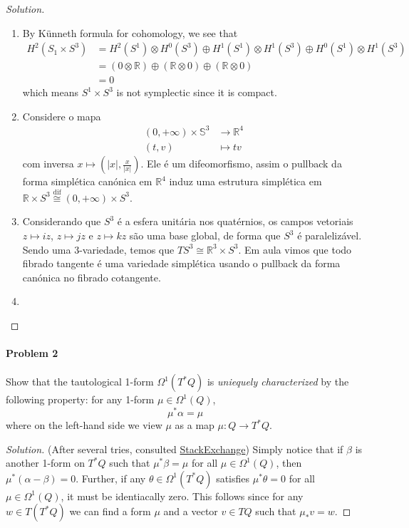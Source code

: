 \begin{proof}[Solution]\leavevmode
	\begin{enumerate}[label=\alph*.]
		\item By K\"unneth formula for cohomology, we see that
			\begin{align*}
				H^{2}(S_1\times S^3)&=H^{2}(S^1)\otimes H^{0}(S^3)\oplus H^{1}(S^1)\otimes H^{1}(S^3)\oplus H^{0}(S^1)\otimes H^{1}(S^3)\\
				&=(0\otimes  \mathbb{R})\oplus (\mathbb{R}\otimes 0)\oplus (\mathbb{R}\otimes 0)\\
				&=0
			\end{align*}
		which means $S^1\times S^3$ is not symplectic since it is compact.

		\item Considere o mapa
			\begin{align*}
				(0,+\infty)\times \mathbb{S}^3 &\longrightarrow \mathbb{R}^4 \\
				(t,v) &\longmapsto tv
			\end{align*}
			com inversa $x\mapsto \left( |x|,\frac{x}{|x|} \right)$. Ele \'e um difeomorfismo, assim o pullback da forma simpl\'etica can\'onica em $\mathbb{R}^{4}$ induz uma estrutura simpl\'etica em $\mathbb{R}\times S^3\overset{\operatorname{dif}}{\cong} (0,+\infty)\times S^3$.

		\item Considerando que $S^3$ \'e a esfera unit\'aria nos quat\'ernios, os campos vetoriais $z\mapsto iz$, $z\mapsto jz$ e $z\mapsto kz$ s\~ao uma base global, de forma que $S^3$ \'e paraleliz\'avel. Sendo uma 3-variedade, temos que $TS^3\cong \mathbb{R}^{3}\times S^3$. Em aula vimos que todo fibrado tangente \'e uma variedade simpl\'etica usando o pullback da forma can\'onica no fibrado cotangente.

		\item 
	\end{enumerate}
\end{proof}

\paragraph{Problem 2} Show that the tautological 1-form $\Omega^{1}(T^*Q)$ is \textit{uniequely characterized} by the following property: for any 1-form $\mu\in\Omega^{1}(Q)$,
\[\mu^*\alpha=\mu\]
where on the left-hand side we view  $\mu$ as a map $\mu:Q\to T^*Q$.

\begin{proof}[Solution]\leavevmode
	(After several tries, consulted \href{https://math.stackexchange.com/questions/4141107/a-characterization-of-the-tautological-form-liouville-1-form-on-the-cotangent}{StackExchange}) Simply notice that if $\beta$ is another 1-form on  $T^*Q$ such that $\mu^*\beta=\mu$ for all $\mu\in\Omega^{1}(Q)$, then  $\mu^*(\alpha-\beta)=0$. Further, if any  $\theta\in\Omega^{1}(T^*Q)$ satisfies $\mu^*\theta=0$ for all $\mu\in\Omega^{1}(Q)$, it must be identiacally zero. This follows since for any $w\in T(T^*Q)$ we can find a form $\mu$ and a vector $v\in TQ$ such that $\mu_*v=w$.
\end{proof}


